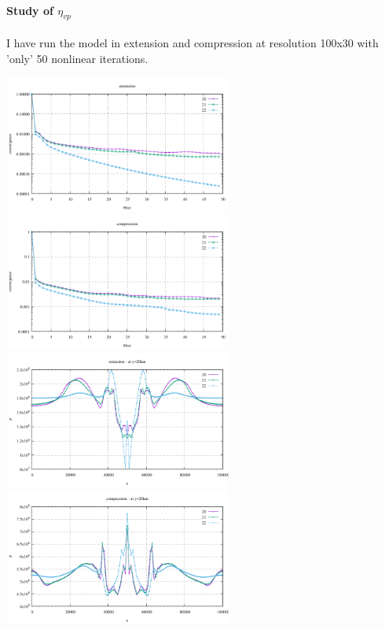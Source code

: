 \newpage
\paragraph{Study of $\eta_{vp}$} I have run the model in extension and compression at 
resolution 100x30 with 'only' 50 nonlinear iterations.  

\begin{center}
\includegraphics[width=7.5cm]{python_codes/fieldstone_70/results_vpstudy/conv_extension.pdf}
\includegraphics[width=7.5cm]{python_codes/fieldstone_70/results_vpstudy/conv_compression.pdf}\\
\includegraphics[width=7.5cm]{python_codes/fieldstone_70/results_vpstudy/pressure_extension.pdf}
\includegraphics[width=7.5cm]{python_codes/fieldstone_70/results_vpstudy/pressure_compression.pdf}\\

\end{center}
